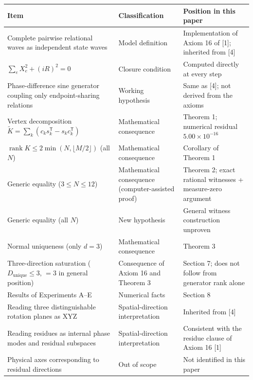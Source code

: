 \documentclass[
  a4paper,
]{article}
\newcounter{none} %
\begin{document}
{\def\LTcaptype{none} %
\begin{longtable}[]{@{}
  >{\raggedright\arraybackslash}p{}
  >{\raggedright\arraybackslash}p{}
  >{\raggedright\arraybackslash}p{}@{}}
\toprule\noalign{}
\begin{minipage}[b]{\linewidth}\raggedright
Item
\end{minipage} & \begin{minipage}[b]{\linewidth}\raggedright
Classification
\end{minipage} & \begin{minipage}[b]{\linewidth}\raggedright
Position in this paper
\end{minipage} \\
\midrule\noalign{}
\endhead
\bottomrule\noalign{}
\endlastfoot
Complete pairwise relational waves as independent state waves & Model
definition & Implementation of Axiom 16 of {[}1{]}; inherited from
{[}4{]} \\
\(\sum_e X_e^2+(iR)^2=0\) & Closure condition & Computed directly at
every step \\
Phase-difference sine generator coupling only endpoint-sharing relations
& Working hypothesis & Same as {[}4{]}; not derived from the axioms \\
Vertex decomposition
\(\widetilde K=\sum_k(c_ks_k^{\mathsf T}-s_kc_k^{\mathsf T})\) &
Mathematical consequence & Theorem 1; numerical residual
\(5.00\times10^{-16}\) \\
\(\operatorname{rank}K\le2\min(N,\lfloor M/2\rfloor)\) (all \(N\)) &
Mathematical consequence & Corollary of Theorem 1 \\
Generic equality (\(3\le N\le12\)) & Mathematical consequence
(computer-assisted proof) & Theorem 2; exact rational witnesses +
measure-zero argument \\
Generic equality (all \(N\)) & New hypothesis & General witness
construction unproven \\
Normal uniqueness (only \(d=3\)) & Mathematical consequence & Theorem
3 \\
Three-direction saturation (\(D_{\mathrm{unique}}\le3\), \(=3\) in
general position) & Consequence of Axiom 16 and Theorem 3 & Section 7;
does not follow from generator rank alone \\
Results of Experiments A--E & Numerical facts & Section 8 \\
Reading three distinguishable rotation planes as XYZ & Spatial-direction
interpretation & Inherited from {[}4{]} \\
Reading residues as internal phase modes and residual subspaces &
Spatial-direction interpretation & Consistent with the residue clause of
Axiom 16 {[}1{]} \\
Physical axes corresponding to residual directions & Out of scope & Not
identified in this paper \\
\end{longtable}
}
\end{document}
